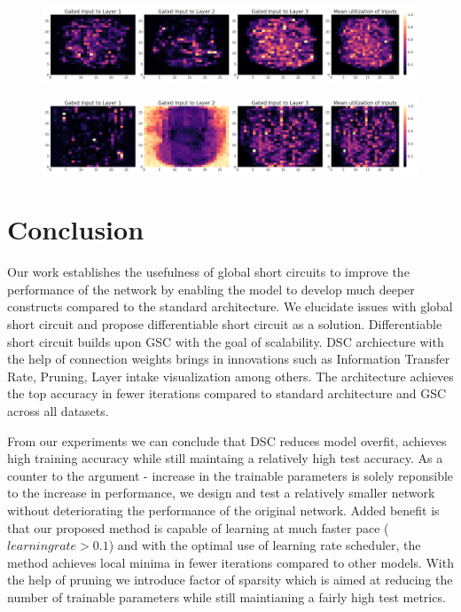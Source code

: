 \documentclass{article}
\begin{document}
\begin{figure}[H]
\centering
\includegraphics[scale=0.2]{paper/mnist_vis.png}
\label{fig:mnist_vis}
\end{figure}

\begin{figure}[H]
\centering
\includegraphics[scale=0.2]{paper/fashionmnist_vis.png}
\label{fig:fashion_mnist_vis}
\end{figure}

\section{Conclusion}

Our work establishes the usefulness of global short circuits to improve the performance of the network by enabling the model to develop much deeper constructs compared to the standard architecture. We elucidate issues with global short circuit and propose differentiable short circuit as a solution. Differentiable short circuit builds upon GSC  with the goal of scalability. DSC archiecture with the help of connection weights brings in innovations such as Information Transfer Rate, Pruning, Layer intake visualization among others. The architecture achieves the top accuracy in fewer iterations compared to standard architecture and GSC across all datasets. 

From our experiments we can conclude that DSC reduces model overfit, achieves high training accuracy while still maintaing a relatively high test accuracy. As a counter to the argument - increase in the trainable parameters is solely reponsible to the increase in performance, we design and test a relatively smaller network without deteriorating the performance of the original network. Added benefit is that our proposed method is capable of learning at much faster pace ($learning rate > 0.1$) and with the optimal use of learning rate scheduler, the method achieves local minima in fewer iterations compared to other models. With the help of pruning we  introduce factor of sparsity which is aimed at reducing the number of trainable parameters while still maintianing a fairly high test metrics.
\end{document}
